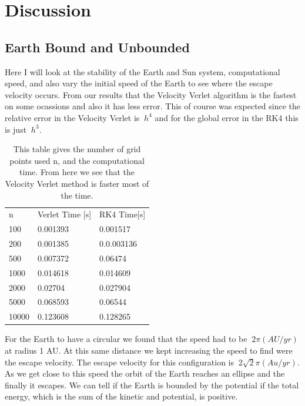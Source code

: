 \documentclass[11pt,a4wide]{article}
\begin{document}
\section{Discussion}
\subsection{Earth Bound and Unbounded}

	Here I will look at the stability of the Earth and Sun system, computational speed, and also vary the initial speed of the Earth to see where the escape velocity occurs. From our results that the Velocity Verlet algorithm is the fastest on some ocassions and also it has less error. This of course was expected since the relative error in the Velocity Verlet is $\ h^4$ and for the global error in the RK4 this is just $\ h^3$. 
\begin{table}[H]
\centering
\label{my-label}
\begin{tabular}{| m{3cm} | m{3cm} | m{3cm} |}
 \cline{1-3}
 n&  Verlet Time [s]&  RK4 Time[s]\\ \cline{1-3}
 100&  0.001393& 0.001517\\ \cline{1-3}
 200&  0.001385& 0.0.003136\\ \cline{1-3}
 500&  0.007372& 0.06474\\ \cline{1-3}
 1000&  0.014618& 0.014609\\ \cline{1-3}
 2000&  0.02704& 0.027904\\ \cline{1-3}
 5000&  0.068593& 0.06544\\ \cline{1-3}
 10000&  0.123608& 0.128265\\ \cline{1-3}
\end{tabular}
\caption{This table gives the number of grid points used n, and the computational time. From here we see that the Velocity Verlet method is faster most of the time. }
\end{table}

	For the Earth to have a circular we found that the speed had to be $\ 2\pi (AU/yr)$ at radius 1 AU. At this same distance we kept increasing the speed to find were the escape velocity. The escape velocity for this configuration is $\ 2\sqrt{2}\pi (Au/yr)$. As we get close to this speed the orbit of the Earth reaches an ellipse and the finally it escapes. We can tell if the Earth is bounded by the potential if the total energy, which is the sum of the kinetic and potential, is positive. 

\end{document}
